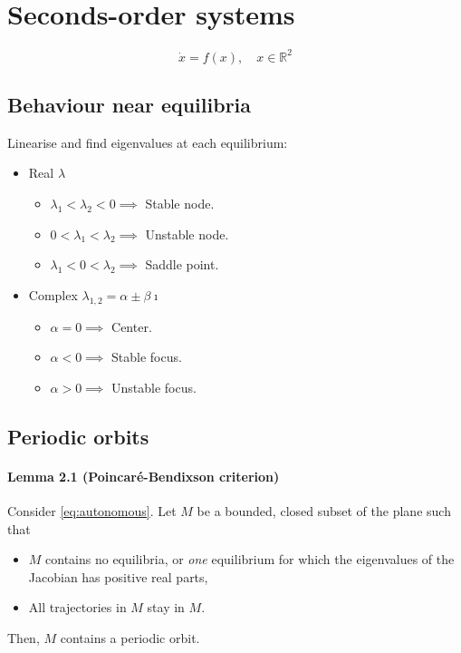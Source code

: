 \section{Seconds-order systems}
\begin{equation}\label{eq:autonomous}
	\dot{x} = f(x), \quad x \in \mathbb{R}^2
\end{equation}

\subsection{Behaviour near equilibria}
Linearise and find eigenvalues at each equilibrium:
\begin{itemize}
	\item Real $\lambda$
	\begin{itemize}
		\item $\lambda_1 < \lambda_2 < 0 \implies$ Stable node.
		\item $0 < \lambda_1 < \lambda_2 \implies$ Unstable node.
		\item $\lambda_1 < 0 < \lambda_2 \implies$ Saddle point.
	\end{itemize}
	\item Complex $\lambda_{1,2} = \alpha \pm \beta \imath$
	\begin{itemize}
		\item $\alpha = 0 \implies$ Center.
		\item $\alpha < 0 \implies$ Stable focus.
		\item $\alpha > 0 \implies$ Unstable focus.
	\end{itemize}
\end{itemize}

\subsection{Periodic orbits}
\paragraph{Lemma 2.1 (Poincaré-Bendixson criterion)}
\begin{sloppypar}
	Consider \eqref{eq:autonomous}. Let $M$ be a bounded, closed subset of the plane such that
\end{sloppypar}
\begin{itemize}
	\item $M$ contains no equilibria, or \emph{one} equilibrium for which the eigenvalues of the Jacobian has positive real parts,
	\item All trajectories in $M$ stay in $M$.
\end{itemize}
Then, $M$ contains a periodic orbit.

